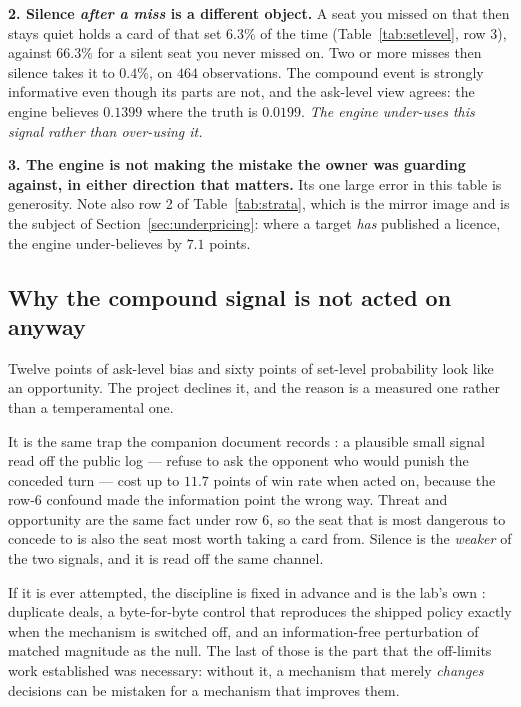 \documentclass[11pt]{article}
\begin{document}
\textbf{2. Silence \emph{after a miss} is a different object.} A seat you missed on that
then stays quiet holds a card of that set $6.3\%$ of the time (Table~\ref{tab:setlevel},
row 3), against $66.3\%$ for a silent seat you never missed on. Two or more misses then
silence takes it to $0.4\%$, on $464$ observations. The compound event is strongly
informative even though its parts are not, and the ask-level view agrees: the engine
believes $0.1399$ where the truth is $0.0199$. \emph{The engine under-uses this signal
rather than over-using it.}

\textbf{3. The engine is not making the mistake the owner was guarding against, in either
direction that matters.} Its one large error in this table is generosity. Note also row 2
of Table~\ref{tab:strata}, which is the mirror image and is the subject of
Section~\ref{sec:underpricing}: where a target \emph{has} published a licence, the engine
under-believes by $7.1$ points.

\subsection{Why the compound signal is not acted on anyway}
\label{sec:notacting}

Twelve points of ask-level bias and sixty points of set-level probability look like an
opportunity. The project declines it, and the reason is a measured one rather than a
temperamental one.

It is the same trap the companion document records \cite{concession}: a plausible small
signal read off the public log --- refuse to ask the opponent who would punish the
conceded turn --- cost up to $11.7$ points of win rate when acted on, because the row-6
confound made the information point the wrong way. Threat and opportunity are the same
fact under row 6, so the seat that is most dangerous to concede to is also the seat most
worth taking a card from. Silence is the \emph{weaker} of the two signals, and it is read
off the same channel.

If it is ever attempted, the discipline is fixed in advance and is the lab's own
\cite{botlab,v05paper}: duplicate deals, a byte-for-byte control that reproduces the
shipped policy exactly when the mechanism is switched off, and an information-free
perturbation of matched magnitude as the null. The last of those is the part that the
off-limits work established was necessary: without it, a mechanism that merely
\emph{changes} decisions can be mistaken for a mechanism that improves them.
\end{document}
